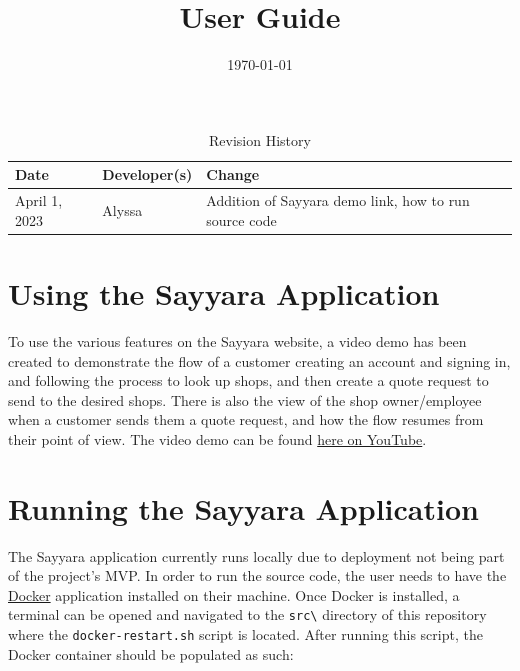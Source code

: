 \documentclass{article}
\title{User Guide\\\progname}
\author{\authname}
\date{\today}
\begin{document}
\begin{table}[hp]
\caption{Revision History} \label{TblRevisionHistory}
\begin{tabularx}{\textwidth}{llX}
\toprule
\textbf{Date} & \textbf{Developer(s)} & \textbf{Change}\\
\midrule
April 1, 2023 & Alyssa & Addition of Sayyara demo link, how to run source code\\
\end{tabularx}
\end{table}

\newpage

\maketitle

\newpage

\section{Using the Sayyara Application}

To use the various features on the Sayyara website, a video demo has been created to demonstrate the flow of a customer creating an account and signing in, and following the process to look up shops, and then create a quote request to send to the desired shops. There is also the view of the shop owner/employee when a customer sends them a quote request, and how the flow resumes from their point of view. The video demo can be found \href{https://www.youtube.com/watch?v=HzWQdQTp5Vs&feature=youtu.be}{here on YouTube}.

\section{Running the Sayyara Application}

The Sayyara application currently runs locally due to deployment not being part of the project's MVP. In order to run the source code, the user needs to have the \href{https://www.docker.com/}{Docker} application installed on their machine. Once Docker is installed, a terminal can be opened and navigated to the \texttt{src\textbackslash} directory of this repository where the \texttt{docker-restart.sh} script is located. After running this script, the Docker container should be populated as such:
\end{document}
